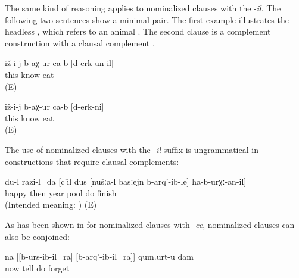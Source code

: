 The same kind of reasoning applies to nominalized clauses with the  -\textit{il}. The following two sentences show a minimal pair. The first example illustrates the headless , which refers to an animal . The second clause is a complement construction with a clausal complement . 
%
\begin{exe}
	\ex	\label{ex:He learned that they ate them}
	\begin{xlist}
			\ex	\label{ex:He got to know who ate (them)@B}
		\gll	iž-i-j	b-aχ-ur	ca-b	[d-erk-un-il]\\
			this	know		eat\\
		\glt	{} (E)
		
		\ex	\label{ex:He got to know that (they) ate (them)@A}
		\gll	iž-i-j	b-aχ-ur	ca-b	[d-erk-ni]\\
			this	know		eat\\
		\glt	{} (E)
	\end{xlist}
\end{exe}

The use of nominalized clauses with the -\textit{il} suffix is ungrammatical in constructions that require clausal complements:

\begin{exe}

	\ex	\label{ex:‎‎‎I am happy that during the next year we will finish building the pool}
	\gll	{*} du-l		razi-l=da		[c'il	dus	[nušːa-l	basːejn	b-arq'-ib-le]	ha-b-urχː-an-il]\\
		{} 	happy	then	year		pool	do	finish \\
	\glt	(Intended meaning: ) (E)
\end{exe}

As has been shown in  for nominalized clauses with -\textit{ce}, nominalized clauses can also be conjoined:

%
\begin{exe}
	\ex	\label{ex:‎I forget what I say and what I do}
	\gll	na	[[b-urs-ib-il=ra]	[b-arq'-ib-il=ra]]	qum.urt-u	dam\\
		now	tell	do	forget	\\
	\glt	{}
\end{exe}


